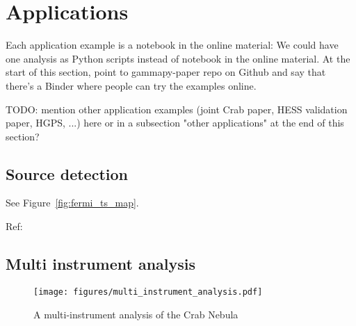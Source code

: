 \section{Applications}
\label{sec:applications}

Each application example is a notebook in the online material: We could have
one analysis as Python scripts instead of notebook in the online material. At
the start of this section, point to gammapy-paper repo on Github and say that
there’s a Binder where people can try the examples online.

TODO: mention other application examples (joint Crab paper, HESS validation
paper, HGPS, ...) here or in a subsection "other applications" at the end of
this section?

\subsection{Source detection}
\label{ssec:source-detection}

See Figure~\ref{fig:fermi_ts_map}.

Ref:~\citep{Stewart2009}

\subsection{Multi instrument analysis}
\label{ssec:multi-instrument-analysis}

\begin{figure}[t]
	\centering
	\texttt{[image: figures/multi\_instrument\_analysis.pdf]}
	\caption{A multi-instrument analysis of the Crab Nebula}
	\label{fig:multi_instrument_analysis} 
\end{figure}